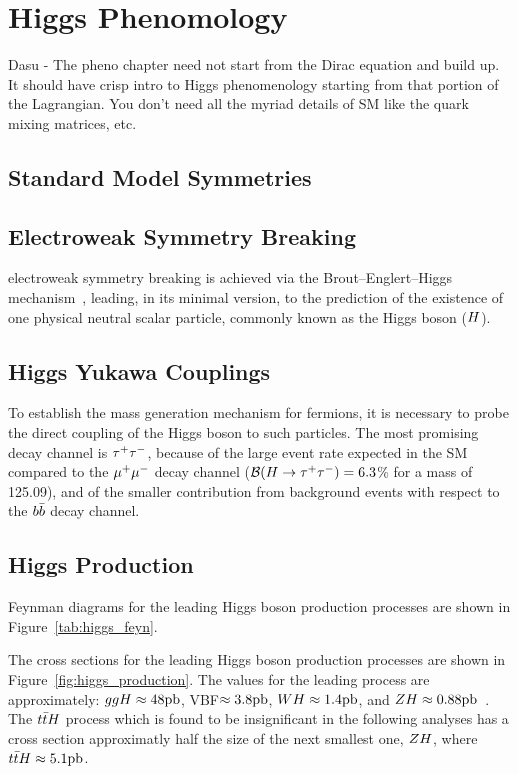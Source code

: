 \chapter{Higgs Phenomology}
\label{sec:pheno}

Dasu -
The pheno chapter need not start from the Dirac equation and build up. It should have crisp intro to Higgs phenomenology starting from that portion of the Lagrangian. You don’t need all the myriad details of SM like the quark mixing matrices, etc.

\section{Standard Model Symmetries}

\section{Electroweak Symmetry Breaking}

electroweak symmetry breaking is achieved via the Brout--Englert--Higgs
mechanism~\cite{Englert:1964et,Higgs:1964ia,Higgs:1964pj,Guralnik:1964eu,Higgs:1966ev,Kibble:1967sv},
leading, in its minimal version, to the prediction of the existence of one physical neutral scalar particle,
commonly known as the Higgs boson ($H$).


\section{Higgs Yukawa Couplings}
To establish the mass generation mechanism for fermions,
 it is necessary to probe the direct coupling of
the Higgs boson to such particles.
The most promising decay channel is $\tau^+\tau^-$,
because of the large event rate expected in the SM compared to the $\mu^+\mu^-$ decay channel ($\mathcal{B}(H\to\tau^+\tau^-)=6.3$\% for a mass of 125.09\GeV), and of the smaller contribution from background events
with respect to the $b\bar{b}$ decay channel.

\section{Higgs Production}

Feynman diagrams for the leading Higgs boson production processes
are shown in Figure~\ref{tab:higgs_feyn}.

The cross sections for the leading Higgs boson production processes
are shown in Figure~\ref{fig:higgs_production}. The values for the leading
process are approximately: $ggH \approx 48\mathrm{pb}$, VBF$ \approx 3.8\mathrm{pb}$, $WH \approx 1.4\mathrm{pb}$,
and $ZH \approx 0.88\mathrm{pb}$~\cite{deFlorian:2016spz}. The $t\bar{t}H$ process
which is found to be insignificant in the following analyses has a cross
section approximatly half the size of the next smallest one, $ZH$, where
$t\bar{t}H \approx 5.1\mathrm{pb}$.


